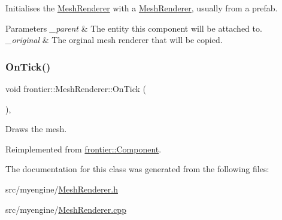 Initialises the \hyperlink{classfrontier_1_1_mesh_renderer}{Mesh\+Renderer} with a \hyperlink{classfrontier_1_1_mesh_renderer}{Mesh\+Renderer}, usually from a prefab. 


\begin{DoxyParams}{Parameters}
{\em \+\_\+parent} & The entity this component will be attached to. \\
\hline
{\em \+\_\+original} & The orginal mesh renderer that will be copied. \\
\hline
\end{DoxyParams}
\mbox{\label{classfrontier_1_1_mesh_renderer_acffde7174ddb009751e360df5d346922}} 
\subsubsection{\texorpdfstring{On\+Tick()}{OnTick()}}
{\footnotesize\ttfamily void frontier\+::\+Mesh\+Renderer\+::\+On\+Tick (\begin{DoxyParamCaption}{ }\end{DoxyParamCaption})\hspace{0.3cm}{\ttfamily [override]}, {\ttfamily [virtual]}}



Draws the mesh. 



Reimplemented from \hyperlink{classfrontier_1_1_component_ab920f9bc07ce051ebb5559c5a66508d1}{frontier\+::\+Component}.



The documentation for this class was generated from the following files\+:\begin{DoxyCompactItemize}
\item 
src/myengine/\hyperlink{_mesh_renderer_8h}{Mesh\+Renderer.\+h}\item 
src/myengine/\hyperlink{_mesh_renderer_8cpp}{Mesh\+Renderer.\+cpp}\end{DoxyCompactItemize}
